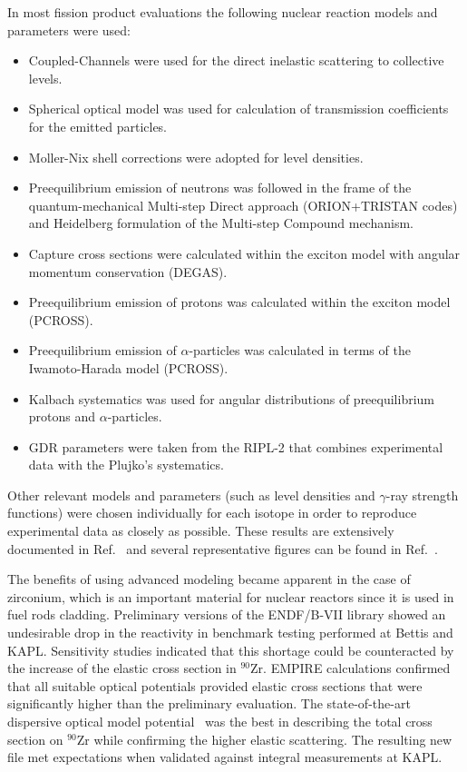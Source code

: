 \documentclass[twocolumn,amsmath,amssymb,10pt,groupedaddress,letter]{revtex4}
\begin{document}
In most fission product evaluations the following nuclear reaction models and parameters were used:
\begin{itemize}
        \item Coupled-Channels were used for the direct inelastic scattering to collective levels.
        \item Spherical optical model was used for calculation of transmission coefficients for the emitted particles.
        \item Moller-Nix shell corrections were adopted for level densities.
        \item Preequilibrium emission of neutrons was followed in the frame of the quantum-mechanical Multi-step Direct approach (ORION+TRISTAN codes) and Heidelberg formulation of the Multi-step Compound mechanism.
        \item Capture cross sections were calculated within the exciton model with angular momentum conservation (DEGAS).
        \item Preequilibrium emission of protons was calculated within the exciton model (PCROSS).
        \item Preequilibrium emission of $\alpha$-particles was calculated in terms of the Iwamoto-Harada model (PCROSS).
        \item Kalbach systematics was used for angular distributions of preequilibrium protons and $\alpha$-particles.
        \item GDR parameters were taken from the RIPL-2 that combines experimental data with the Plujko's systematics.
\end{itemize}
\noindent Other relevant models and parameters (such as level densities and $\gamma$-ray strength functions) were chosen individually for each isotope in order to reproduce experimental data as closely as possible.
These results are extensively documented in Ref.~\cite{Kim:07} and several representative figures can be found in Ref.~\cite{ENDF-VII}.



The benefits of using advanced modeling became apparent in the case of zirconium, which is an important material for nuclear reactors since it is used in fuel rods cladding. Preliminary versions of the ENDF/B-VII library showed an undesirable drop in the reactivity in benchmark testing performed at Bettis and KAPL. Sensitivity studies indicated that this shortage could be counteracted by the increase of the elastic cross section in $^{90}$Zr. EMPIRE calculations confirmed that all suitable optical potentials provided elastic cross sections that were significantly higher than the preliminary evaluation.  The state-of-the-art  dispersive optical model potential~\cite{Capote:06, Capote:05, Soukhovitskii:05} was the best in describing the total cross section on $^{90}$Zr while confirming the higher elastic scattering. The resulting new file met expectations when validated against integral measurements at KAPL.
\end{document}
